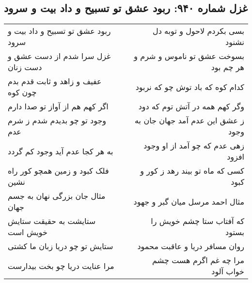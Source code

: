 \begin{center}
\section*{غزل شماره ۹۴۰: ربود عشق تو تسبیح و داد بیت و سرود}
\label{sec:0940}
\begin{longtable}{l p{0.5cm} r}
ربود عشق تو تسبیح و داد بیت و سرود
&&
بسی بکردم لاحول و توبه دل نشنود
\\
غزل سرا شدم از دست عشق و دست زنان
&&
بسوخت عشق تو ناموس و شرم و هر چم بود
\\
عفیف و زاهد و ثابت قدم بدم چون کوه
&&
کدام کوه که باد توش چو که نربود
\\
اگر کهم هم از آواز تو صدا دارم
&&
وگر کهم همه در آتش توم که دود
\\
وجود تو چو بدیدم شدم ز شرم عدم
&&
ز عشق این عدم آمد جهان جان به وجود
\\
به هر کجا عدم آید وجود کم گردد
&&
زهی عدم که چو آمد از او وجود افزود
\\
فلک کبود و زمین همچو کور راه نشین
&&
کسی که ماه تو بیند رهد ز کور و کبود
\\
مثال جان بزرگی نهان به جسم جهان
&&
مثال احمد مرسل میان گبر و جهود
\\
ستایشت به حقیقت ستایش خویش است
&&
که آفتاب ستا چشم خویش را بستود
\\
ستایش تو چو دریا زبان ما کشتی
&&
روان مسافر دریا و عاقبت محمود
\\
مرا عنایت دریا چو بخت بیدارست
&&
مرا چه غم اگرم هست چشم خواب آلود
\\
\end{longtable}
\end{center}
